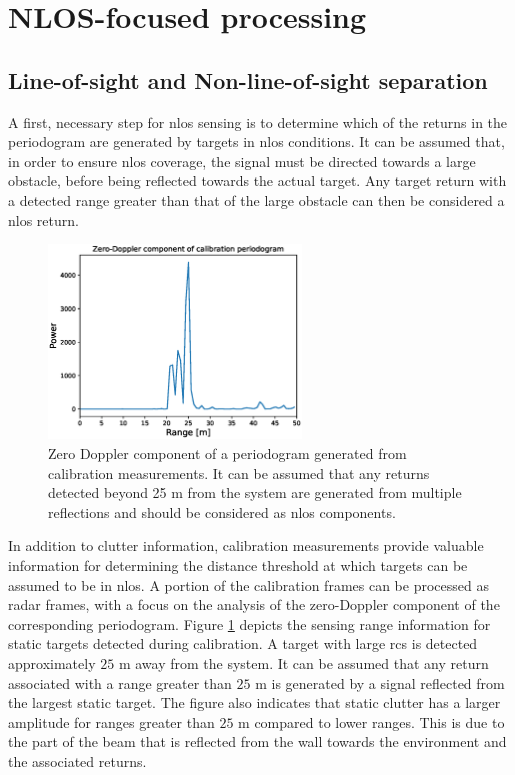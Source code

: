 	\newpage
	\section{NLOS-focused processing}
	\label{sec:nlos_proc_pipeline}
	
		\subsection{Line-of-sight and Non-line-of-sight separation}
		\label{sec:los_nlos_separation}
			
			A first, necessary step for \gls{nlos} sensing is to determine which of the returns in the periodogram are generated by targets in \gls{nlos} conditions.
			It can be assumed that, in order to ensure \gls{nlos} coverage, the signal must be directed towards a large obstacle, before being reflected towards the actual target.
			Any target return with a detected range greater than that of the large obstacle can then be considered a \gls{nlos} return.
			\begin{figure}[H]
				\centering
				\includegraphics[width=0.6\textwidth]{Images/Test1/cali_static_per_t1.eps}
				\caption{\small Zero Doppler component of a periodogram generated from calibration measurements. It can be assumed that any returns detected beyond 25 m from the system are generated from multiple reflections and should be considered as \gls{nlos} components. }
				\label{fig:Test1_cali_static_per}
			\end{figure}
			In addition to clutter information, calibration measurements provide valuable information for determining the distance threshold at which targets can be assumed to be in \gls{nlos}. 
			A portion of the calibration frames can be processed as radar frames, with a focus on the analysis of the zero-Doppler component of the corresponding periodogram.
			Figure \ref{fig:Test1_cali_static_per} depicts the sensing range information for static targets detected during calibration. 
			A target with large \gls{rcs} is detected approximately $25$ m away from the system. 
			It can be assumed that any return associated with a range greater than $25$ m is generated by a signal reflected from the largest static target.
			The figure also indicates that static clutter has a larger amplitude for ranges greater than $25$ m compared to lower ranges.
			This is due to the part of the beam that is reflected from the wall towards the environment and the associated returns.
			
